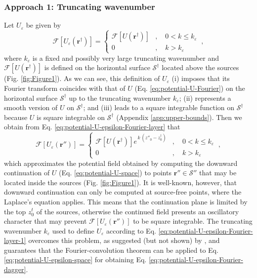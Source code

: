 \subsubsection{Approach 1: Truncating wavenumber}

Let $U_{\varepsilon}$ be given by
\begin{equation}
	\mathcal{F} [ U_{\varepsilon}(\mathbf{r}^{\dagger}) ] = 
	\begin{cases}
		\mathcal{F} [ U(\mathbf{r}^{\dagger}) ] &
		, \quad 0 < k \le k_{\varepsilon} \\
		0 & , \quad k > k_{\varepsilon} 
	\end{cases} \: ,
	\label{eq:potential-U-epsilon-Fourier-dagger-1}
\end{equation}
where $k_{\varepsilon}$ is a fixed and possibly very large truncating wavenumber and 
$\mathcal{F} \left[ U(\mathbf{r}^{\dagger}) \right]$ is defined on the horizontal surface $\mathcal{S}^{\dagger}$ 
located above the sources (Fig. \ref{fig:Figure1}). 
As we can see, this definition of $U_{\varepsilon}$ 
(i) imposes that its Fourier transform coincides with 
that of $U$ (Eq. \ref{eq:potential-U-Fourier}) on the horizontal surface $\mathcal{S}^{\dagger}$ 
up to the truncating wavenumber $k_{\varepsilon}$; 
(ii) represents a smooth version of $U$ on $\mathcal{S}^{\dagger}$; and
(iii) leads to a square integrable function on $\mathcal{S}^{\dagger}$ because 
$U$ is square integrable on $\mathcal{S}^{\dagger}$ (Appendix \ref{app:upper-bounds}).
Then we obtain from Eq. \ref{eq:potential-U-epsilon-Fourier-layer} that 
\begin{equation}
	\mathcal{F} \left[ U_{\varepsilon}(\mathbf{r}'') \right] = 
	\begin{cases}
		\mathcal{F} \left[ U(\mathbf{r}^{\dagger}) \right] 
		e^{\, k \, (z''_{0} - z^{\dagger}_{0})} & , 
		\quad 0 < k \le k_{\varepsilon} \\
		0 & , \quad k > k_{\varepsilon} 
	\end{cases} \: ,
	\label{eq:potential-U-epsilon-Fourier-layer-1}
\end{equation}
which approximates the potential field obtained by 
computing the downward continuation of $U$ (Eq. \ref{eq:potential-U-space}) 
to points $\mathbf{r}'' \in \mathcal{S}''$ that may be located inside the sources (Fig. \ref{fig:Figure1}). 
It is well-known, however, that downward continuation can only be computed at 
source-free points, where the Laplace's equation applies. This means that the
continuation plane is limited by the top $z^{t}_{0}$ of the sources, otherwise the continued field 
presents an oscillatory character \citep[e.g.,][]{roy1967, fedi_florio2002} that may
prevent $\mathcal{F} \left[ U_{\varepsilon}(\mathbf{r}'') \right]$ to be square integrable.
The truncating wavenumber $k_{\varepsilon}$ used to define $U_{\varepsilon}$ according to Eq. 
\ref{eq:potential-U-epsilon-Fourier-layer-1} overcomes this problem, as suggested (but not shown) 
by \cite{bhattacharyya1967},
and guarantees that the Fourier-convolution theorem can be applied to Eq. \ref{eq:potential-U-epsilon-space} 
for obtaining Eq. \ref{eq:potential-U-epsilon-Fourier-dagger}.

